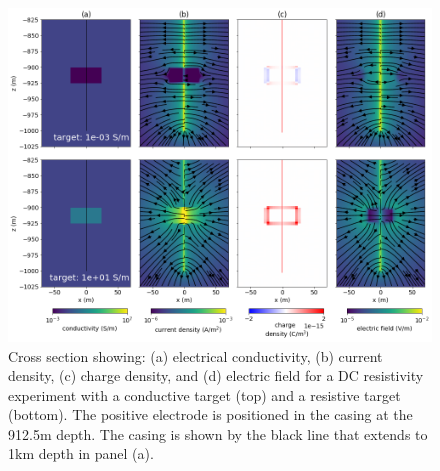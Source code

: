 \begin{figure}
    \begin{center}
    \includegraphics[width=\textwidth]{figures/dc_casing/target_physics.png}
    \end{center}
\caption{
    Cross section showing: (a) electrical conductivity, (b) current density, (c) charge density, and
    (d) electric field for a DC resistivity experiment with a conductive target (top) and a resistive target
    (bottom). The positive electrode is positioned in the casing at the 912.5m depth.
    The casing is shown by the black line that extends to 1km
    depth in panel (a).
}
\label{fig:target_physics}
\end{figure}
